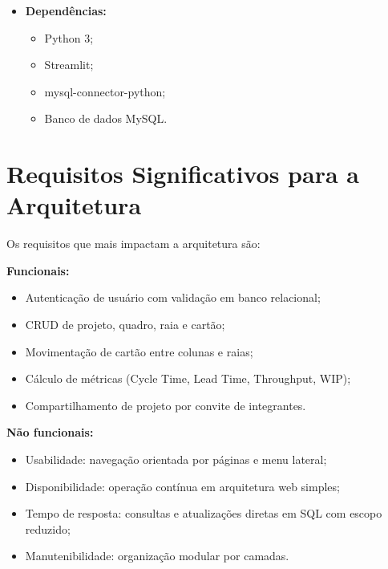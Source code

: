 \begin{itemize}
    \item \textbf{Dependências:}
    \begin{itemize}
        \item Python 3;
        \item Streamlit;
        \item mysql-connector-python;
        \item Banco de dados MySQL.
    \end{itemize}
\end{itemize}

\section{Requisitos Significativos para a Arquitetura}
Os requisitos que mais impactam a arquitetura são:

\textbf{Funcionais:}
\begin{itemize}
    \item Autenticação de usuário com validação em banco relacional;
    \item CRUD de projeto, quadro, raia e cartão;
    \item Movimentação de cartão entre colunas e raias;
    \item Cálculo de métricas (Cycle Time, Lead Time, Throughput, WIP);
    \item Compartilhamento de projeto por convite de integrantes.
\end{itemize}

\textbf{Não funcionais:}
\begin{itemize}
    \item Usabilidade: navegação orientada por páginas e menu lateral;
    \item Disponibilidade: operação contínua em arquitetura web simples;
    \item Tempo de resposta: consultas e atualizações diretas em SQL com escopo reduzido;
    \item Manutenibilidade: organização modular por camadas.
\end{itemize}


